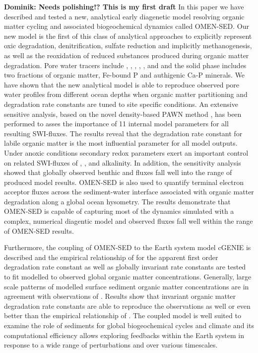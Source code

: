 \documentclass[gmd, manuscript]{copernicus}
\begin{document}
\conclusions  %
\textbf{Dominik: Needs polishing!? This is my first draft}
In this paper we have described and tested a new, analytical early diagenetic model resolving organic matter cycling and associated biogeochemical dynamics called OMEN-SED. 
Our new model is the first of this class of analytical approaches to explicitly represent oxic degradation, denitrification, sulfate reduction and implicitly methanogenesis, 
as well as the reoxidation of reduced substances produced during organic matter degradation. Pore water tracers include , , , , ,  and  and the solid phase includes 
two fractions of organic matter, Fe-bound P and authigenic Ca-P minerals. 
We have shown that the new analytical model is able to reproduce observed pore water profiles from different ocean depths when organic matter partitioning and degradation rate constants are tuned to site specific conditions. An extensive sensitive analysis, 
based on the novel density-based PAWN method \citep{pianosi_simple_2015}, has been performed to asses the importance of 11 internal model parameters for all resulting SWI-fluxes. The results reveal that the degradation rate constant for labile organic 
matter is the most influential parameter for all model outputs. Under anoxic conditions secondary redox parameters exert an important control on related SWI-fluxes of , ,  and alkalinity. 
In addition, the sensitivity analysis showed that globally observed benthic  and  fluxes fall well into the range of produced model results. 
OMEN-SED is also used to quantify terminal electron acceptor fluxes across the sediment-water interface associated with organic matter degradation along a global ocean hysometry. 
The results demonstrate that OMEN-SED is capable of capturing most of the dynamics simulated with a complex, numerical diagentic model and observed fluxes fall well 
within the range of OMEN-SED results. 

Furthermore, the coupling of OMEN-SED to the Earth system model cGENIE is described and the empirical relationship of \citet{boudreau1997diagenetic} for 
the apparent first order degradation rate constant as well as globally invariant rate constants are tested to fit modelled to observed global 
organic matter concentrations. Generally, large scale patterns of modelled surface sediment organic matter concentrations are in agreement with 
observations of \citet{seiter_organic_2004}. Results show that invariant organic matter degradation rate constants are able to reproduce the 
observations as well or even better than the empirical relationship of \citet{boudreau1997diagenetic}. 
The coupled model is well suited to examine the role of sediments for global biogeochemical cycles and climate and its computational efficiency allows 
exploring feedbacks within the Earth system in response to a wide range of perturbations and over various timescales.
\end{document}
